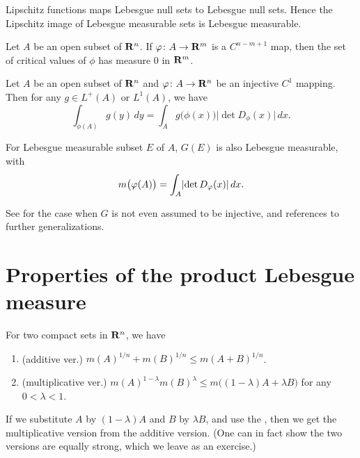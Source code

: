 \begin{prop}
    Lipschitz functions maps Lebesgue null sets to Lebesgue null sets. Hence the Lipschitz image of Lebesgue measurable sets is Lebesgue measurable.
\end{prop}

\begin{namedthm}
    Let $A$ be an open subset of $\mathbf{R}^n$. If $\varphi\colon A \to \mathbf{R}^m$ is a $C^{n - m + 1}$ map, then the set of critical values of $\phi$ has measure $0$ in $\mathbf{R}^m$.
\end{namedthm}

\begin{namedthm}
    Let $A$ be an open subset of $\mathbf{R}^n$ and $\varphi\colon A\to \mathbf{R}^n$ be an injective $C^1$ mapping. Then for any $g\in L^{+}(A)$ or $L^1(A)$, we have \[
        \int_{\phi(A)} g(y)\,dy = \int_A g\bigl(\phi(x)\bigr)\bigl\vert\det D_\phi(x)\bigr\vert\,dx.
    \]
\end{namedthm}


For Lebesgue measurable subset $E$ of $A$, $G(E)$ is also Lebesgue measurable, with \[
    m\bigl(\varphi(A)\bigr) = \int_A \lvert \det D_\varphi(x) \rvert\,dx.
\]

See \cite[Appendix~F]{Taylor_2006} for the case when $G$ is not even assumed to be injective, and references to further generalizations.

\section{Properties of the product Lebesgue measure}

\begin{namedthm} %
    For two compact sets in $\mathbf{R}^n$, we have \begin{enumerate}
        \item (additive ver.) $m(A)^{1/n} + m(B)^{1/n}\leq m(A +B)^{1/n}$. 
        \item (multiplicative ver.) $m(A)^{1- \lambda}m(B)^\lambda \leq m\bigl((1-\lambda) A + \lambda B\bigr)$ for any $0 < \lambda < 1$.
    \end{enumerate}
\end{namedthm}

If we substitute $A$ by $(1-\lambda) A$ and $B$ by $\lambda B$, and use the , then we get the multiplicative version from the additive version. (One can in fact show the two versions are equally strong, which we leave as an exercise.)

